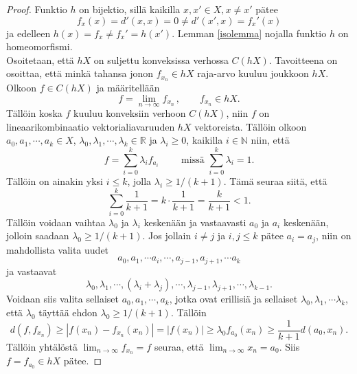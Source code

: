 \documentclass[12pt,a4paper,leqno]{report}
\newcommand{\R}{\mathbb{R}}
\newcommand{\N}{\mathbb{N}}
\theoremstyle{plain}
\theoremstyle{definition}
\theoremstyle{remark}
\begin{document}
\begin{proof}
Funktio $h$ on bijektio, sillä kaikilla $x,x'\in X,x\neq x'$ pätee $$ f_x (x)=d'(x,x)=0\neq d'(x',x)=f_x' (x)$$ ja edelleen $h(x)=f_x \neq f_x'=h(x') $. Lemman \ref{isolemma} nojalla funktio $h$ on homeomorfismi.\\
Osoitetaan, että $hX$ on suljettu konveksissa verhossa $C(hX)$. Tavoitteena on osoittaa, että minkä tahansa jonon $f_{x_n}\in hX$ raja-arvo kuuluu joukkoon $ hX$. Olkoon $f\in C(hX)$ ja määritellään 
$$f=\lim_{n\rightarrow\infty} f_{x_n} \, , \qquad f_{x_n}\in hX.$$ 
Tällöin koska $f$ kuuluu konveksiin verhoon $C(hX)$, niin $f$ on lineaarikombinaatio vektorialiavaruuden $hX$ vektoreista. Tällöin olkoon $a_0,a_1,\cdots, a_k \in X$, $\lambda_0,\lambda_1,\cdots, \lambda_k \in \R$ ja $\lambda_i\geq 0$, kaikilla $ i\in\N$ niin, että $$f=\sum_{i=0}^k \lambda_i f_{a_i}\qquad \text{ missä } \sum_{i=0}^k \lambda_i =1.$$
Tällöin on ainakin yksi $i\leq k$, jolla $\lambda_i \geq 1/(k+1)$. Tämä seuraa siitä, että $$\sum_{i=0}^k \frac{1}{k+1}=k\cdot \dfrac{1}{k+1}=\dfrac{k}{k+1}<1 .$$ Tällöin voidaan vaihtaa $\lambda_0$ ja $\lambda_i$ keskenään ja vastaavasti $a_0$ ja $a_i$ keskenään, jolloin saadaan $\lambda_0\geq 1/(k+1)$. Jos jollain $i\neq j$ ja $i,j\leq k$ %
pätee $ a_i=a_j$, niin on mahdollista valita uudet $$a_0,a_1,\cdots a_i,\cdots, a_{j-1},a_{j+1},\cdots a_{k}$$ ja vastaavat $$\lambda_0,\lambda_1,\cdots, (\lambda_i+\lambda_j),\cdots ,
\lambda_{j-1},
\lambda_{j+1},\cdots, \lambda_{k-1}.$$ 
Voidaan siis valita sellaiset $a_0,a_1,\cdots, a_k$, jotka ovat erillisiä ja sellaiset $\lambda_0,\lambda_1,\cdots \lambda_k$, että $\lambda_0$ täyttää ehdon $\lambda_0\geq 1/(k+1)$. Tällöin $$d(f,f_{x_n})\geq |f(x_n)-f_{x_n}(x_n)|=|f(x_n)|\geq \lambda_0 f_{a_0}(x_n)\geq \dfrac{1}{k+1}d(a_0,x_n).$$
Tällöin yhtälöstä $\lim_{n\rightarrow\infty} f_{x_n}=f$ seuraa, että $\lim_{n\rightarrow\infty }x_n=a_0$. Siis $ f=f_{a_0}\in hX$ pätee.

\end{proof}
\end{document}
